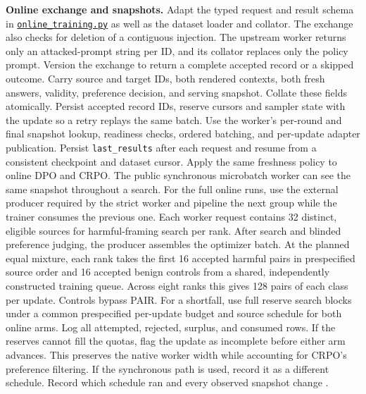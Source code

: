 \documentclass[11pt]{article}
\begin{document}
\textbf{Online exchange and snapshots.} Adapt the typed request and result schema in \href{https://github.com/Sizhe-Chen/SecPO/blob/da0372a0e598badf4e51c98c175a962147cac2ac/src/secpo/online_training.py}{\texttt{online\_training.py}} as well as the dataset loader and collator. The exchange also checks for deletion of a contiguous injection. The upstream worker returns only an attacked-prompt string per ID, and its collator replaces only the policy prompt. Version the exchange to return a complete accepted record or a skipped outcome. Carry source and target IDs, both rendered contexts, both fresh answers, validity, preference decision, and serving snapshot. Collate these fields atomically. Persist accepted record IDs, reserve cursors and sampler state with the update so a retry replays the same batch. Use the worker's per-round and final snapshot lookup, readiness checks, ordered batching, and per-update adapter publication. Persist \texttt{last\_results} after each request and resume from a consistent checkpoint and dataset cursor. Apply the same freshness policy to online DPO and CRPO. The public synchronous microbatch worker can see the same snapshot throughout a search. For the full online runs, use the external producer required by the strict worker and pipeline the next group while the trainer consumes the previous one. Each worker request contains 32 distinct, eligible sources for harmful-framing search per rank. After search and blinded preference judging, the producer assembles the optimizer batch. At the planned equal mixture, each rank takes the first 16 accepted harmful pairs in prespecified source order and 16 accepted benign controls from a shared, independently constructed training queue. Across eight ranks this gives 128 pairs of each class per update. Controls bypass PAIR. For a shortfall, use full reserve search blocks under a common prespecified per-update budget and source schedule for both online arms. Log all attempted, rejected, surplus, and consumed rows. If the reserves cannot fill the quotas, flag the update as incomplete before either arm advances. This preserves the native worker width while accounting for CRPO's preference filtering. If the synchronous path is used, record it as a different schedule. Record which schedule ran and every observed snapshot change \cite{secpocode}.
\end{document}
